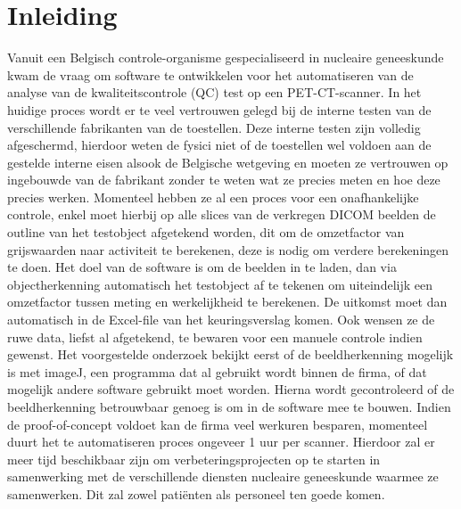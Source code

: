 \documentclass{hogent-article}
\begin{document}



\section{Inleiding}%
\label{sec:inleiding}


Vanuit een Belgisch controle-organisme gespecialiseerd in nucleaire geneeskunde kwam de vraag om software te ontwikkelen voor het automatiseren van de analyse van de kwaliteitscontrole (QC) test op een PET-CT-scanner. In het huidige proces wordt er te veel vertrouwen gelegd bij de interne testen van de verschillende fabrikanten van de toestellen. Deze interne testen zijn volledig afgeschermd, hierdoor weten de fysici niet of de toestellen wel voldoen aan de gestelde interne eisen alsook de Belgische wetgeving en moeten ze vertrouwen op ingebouwde van de fabrikant zonder te weten wat ze precies meten en hoe deze precies werken.
Momenteel hebben ze al een proces voor een onafhankelijke controle, enkel moet hierbij op alle slices van de verkregen DICOM beelden de outline van het testobject afgetekend worden, dit om de omzetfactor van grijswaarden naar activiteit te berekenen, deze is nodig om verdere berekeningen te doen. Het doel van de software is om de beelden in te laden, dan via objectherkenning automatisch het testobject af te tekenen om uiteindelijk een omzetfactor tussen meting en werkelijkheid te berekenen. De uitkomst moet dan automatisch in de Excel-file van het keuringsverslag komen. Ook wensen ze de ruwe data, liefst al afgetekend, te bewaren voor een manuele controle indien gewenst.
Het voorgestelde onderzoek bekijkt eerst of de beeldherkenning mogelijk is met imageJ, een programma dat al gebruikt wordt binnen de firma, of dat mogelijk andere software gebruikt moet worden. Hierna wordt gecontroleerd of de beeldherkenning betrouwbaar genoeg is om in de software mee te bouwen.
Indien de proof-of-concept voldoet kan de firma veel werkuren besparen, momenteel duurt het te automatiseren proces ongeveer 1 uur per scanner. Hierdoor zal er meer tijd beschikbaar zijn om verbeteringsprojecten op te starten in samenwerking met de verschillende diensten nucleaire geneeskunde waarmee ze samenwerken. Dit zal zowel patiënten als personeel ten goede komen.
\end{document}
